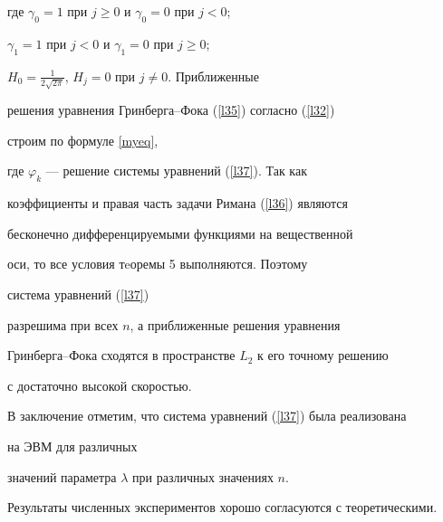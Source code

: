 где $\gamma_0=1$ при $j\geqslant 0$ и $\gamma_0=0$ при $j<0$;


$\gamma_1=1$ при $j<0$ и $\gamma_1=0$ при $j\geqslant0$;


$H_0=\frac{1}{2\sqrt{2\pi}}$, $H_j=0$ при $j\neq 0$. Приближенные


решения уравнения Гринберга--Фока (\ref{l35}) согласно (\ref{l32})


строим по формуле \eqref{myeq},


где $\varphi_k$ --- решение системы уравнений (\ref{l37}). Так как


коэффициенты и правая часть задачи Римана (\ref{l36}) являются


бесконечно дифференцируемыми функциями на вещественной


оси, то все условия тeоремы 5 выполняются. Поэтому


система уравнений (\ref{l37})


разрешима при всех $n$, а приближенные решения уравнения


Гринберга--Фока сходятся в пространстве $L_2$ к его точному решению


с достаточно высокой скоростью.





В заключение отметим, что система уравнений (\ref{l37}) была реализована 


на ЭВМ для различных


значений параметра $\lambda$ при различных значениях $n$.


Результаты численных экспериментов хорошо согласуются с теоретическими.








